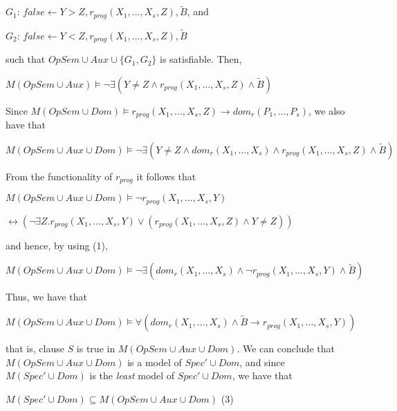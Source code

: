 \documentclass[english]{tlp}
\begin{document}
\smallskip
$G_1$: $\textit{false}  \leftarrow Y\!>\!Z, r_{\textit{prog}}(X_1,\ldots,X_s,Z), \widetilde{B}$,
and 

$G_2$: $\textit{false} \leftarrow Y\!<\!Z, r_{\textit{prog}}(X_1,\ldots,X_s,Z), \widetilde{B}$ 

\smallskip
\noindent
such that $\textit{OpSem}\cup \textit{Aux} \cup \{G_1,G_2\}$ is satisfiable.
Then, 

\smallskip
$M(\textit{OpSem}\cup \textit{Aux}) \models \neg\exists (Y\neq Z \wedge r_{\textit{prog}}(X_1,\ldots,X_s,Z) \wedge \widetilde{B})$

\smallskip
\noindent
Since $M(\textit{OpSem}\cup \textit{Dom}) \models r_{\textit{prog}}(X_1,\ldots,X_s,Z) \rightarrow \textit{dom}_r(P_1,\ldots,P_s)$, we also have that

\smallskip
$M(\!\textit{OpSem} \cup \textit{Aux} \cup \textit{Dom})\! \models\! \neg\exists (\!Y\!\neq\! Z \wedge \textit{dom}_r(X_1,\ldots,X_s) \wedge r_{\textit{prog}}(X_1,\ldots,X_s,Z) \wedge \widetilde{B})$

\smallskip
\noindent
From the functionality of $ r_{\textit{prog}}$ it follows that 

\smallskip
$M(\textit{OpSem}\cup \textit{Aux}\cup \textit{Dom}) \models \neg r_{\textit{prog}}(X_1,\ldots,X_s,Y)$ 

\hfill
$ \leftrightarrow (\neg \exists Z. r_{\textit{prog}}(X_1,\ldots,X_s,Y) \vee (r_{\textit{prog}}(X_1,\ldots,X_s,Z) \wedge Y\!\neq\! Z))$

\smallskip
\noindent
 and hence, by using (1), 

\smallskip
$M(\textit{OpSem}\cup \textit{Aux}\cup \textit{Dom}) \models \neg\exists (\textit{dom}_r(X_1,\ldots,X_s) \wedge\neg r_{\textit{prog}}(X_1,\ldots,X_s,Y) \wedge \widetilde{B})$

\smallskip
\noindent
Thus, we have that 

\smallskip
$M(\textit{OpSem}\cup \textit{Aux}\cup \textit{Dom}) \models\forall (\textit{dom}_r(X_1,\ldots,X_s)  \wedge \widetilde{B} \rightarrow r_{\textit{prog}}(X_1,\ldots,X_s,Y))$

\smallskip
\noindent
that is, clause
$S$ is true in $M(\textit{OpSem}\cup \textit{Aux} \cup \textit{Dom})$.
We can conclude that $M(\textit{OpSem}\cup \textit{Aux}\cup \textit{Dom})$ is a model of
$\textit{Spec}'\cup \textit{Dom}$, and since $M(\textit{Spec}'\cup \textit{Dom})$ is the {\it least} model of $\textit{Spec}'\cup \textit{Dom}$, we have that

\smallskip
$M(\textit{Spec}'\cup \textit{Dom}) \subseteq M(\textit{OpSem}\cup \textit{Aux}\cup \textit{Dom})$ \hfill (3)
\end{document}
